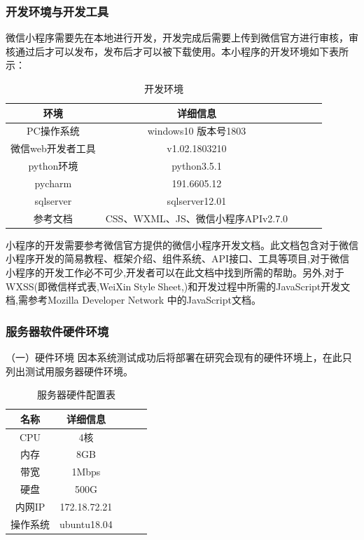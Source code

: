 \documentclass[a4paper]{ltxdoc}
\begin{document}
{		\subsubsection{开发环境与开发工具}
		微信小程序需要先在本地进行开发，开发完成后需要上传到微信官方进行审核，审核通过后才可以发布，发布后才可以被下载使用。本小程序的开发环境如下表所示：
		
		\begin{center}
			\begin{table}[!htb]
				\centering
				\caption{开发环境}
				\begin{tabular}{ccccc}
					\hline
					环境                      				&详细信息\\ \hline
					\multirow{1}{*}{PC操作系统} 				&windows10 版本号1803\\ \hline
					\multirow{1}{*}{微信web开发者工具}     	&v1.02.1803210\\ \hline
					\multirow{1}{*}{python环境}     			&python3.5.1\\ \hline
					\multirow{1}{*}{pycharm}  				&191.6605.12\\ \hline
					\multirow{1}{*}{sqlserver}    			&sqlserver12.01\\ \hline
					\multirow{1}{*}{参考文档}    			&CSS、WXML、JS、微信小程序APIv2.7.0\\ \hline
				\end{tabular}
			\end{table}
		\end{center}
		
		小程序的开发需要参考微信官方提供的微信小程序开发文档。此文档包含对于微信小程序开发的简易教程、框架介绍、组件系统、API接口、工具等项目,对于微信小程序的开发工作必不可少,开发者可以在此文档中找到所需的帮助。另外,对于WXSS(即微信样式表,WeiXinStyleSheet,)和开发过程中所需的JavaScript开发文档,需参考Mozilla Developer Network 中的JavaScript文档。
		
		\subsubsection{服务器软件硬件环境}
		（一）硬件环境
		因本系统测试成功后将部署在研究会现有的硬件环境上，在此只列出测试用服务器硬件环境。
		\begin{center}
			\begin{table}[!htb]
				\centering
				\caption{服务器硬件配置表}
				\begin{tabular}{ccccc}
					\hline
					名称                      				&详细信息\\ \hline
					\multirow{1}{*}{CPU} 					&4核\\ \hline
					\multirow{1}{*}{内存}     				&8GB\\ \hline
					\multirow{1}{*}{带宽}     				&1Mbps\\ \hline
					\multirow{1}{*}{硬盘}    				&500G\\ \hline
					\multirow{1}{*}{内网IP}  				&172.18.72.21\\ \hline
					\multirow{1}{*}{操作系统}    			&ubuntu18.04\\ \hline
				\end{tabular}
			\end{table}
		\end{center}
		
}
\end{document}

